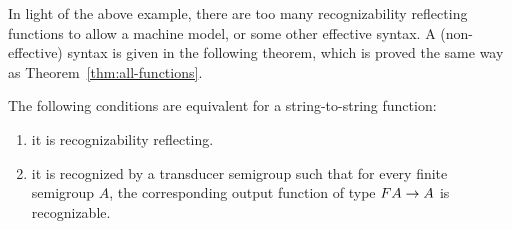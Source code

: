 In light of the above example, there are too many recognizability reflecting functions to allow a machine model, or some other effective syntax. A (non-effective) syntax is given in the following theorem, which is proved the same way as Theorem~\ref{thm:all-functions}.

\begin{theorem}\label{thm:reco-reflecting-functions} The following conditions are equivalent for a string-to-string function:
 \begin{enumerate}
 \item \label{it:reco-refl} it is recognizability reflecting.
 \item \label{it:trans-semig-reco}it is recognized by a transducer semigroup such that for every finite semigroup $A$, the corresponding output function of type 
 $\functor A \to A$
 is recognizable.
 \end{enumerate}
\end{theorem}
